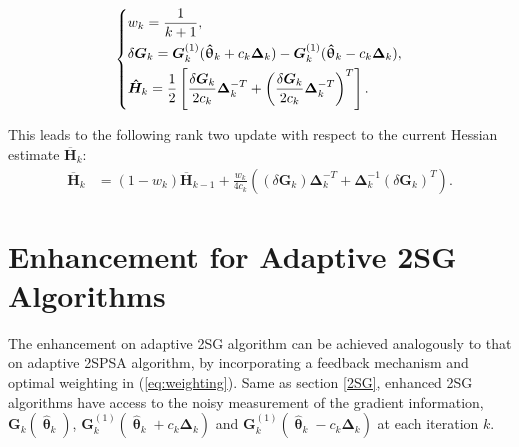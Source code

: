 \documentclass[conference,10.6cpt]{IEEEtran}
\newcommand{\bG}{\bm{G}}
\newcommand{\bDelta}{\bm{\Delta}}
\newcommand{\oH}{\bm{\overline{H}}}
\newcommand{\hH}{\bm{\hat{H}}}
\newcommand{\htheta}{\bm{\hat{\uptheta}}}
\newcommand{\remove}[1]{}
\begin{document}
\begin{equation} \label{eq:notationSG}
  \begin{dcases}
    w_k=\frac{1}{k+1},\\
    \delta\bG_k=\bG_k^{(1)}(\htheta_k+ c_k\bDelta_k)-\bG_k^{(1)}(\htheta_k- c_k\bDelta_k),\\
    \hH_k=\frac{1}{2}\left[ \frac{\delta\bG_k}{2c_k}\bDelta_k^{-T}+\left(\frac{\delta\bG_k}{2c_k}\bDelta_k^{-T}\right)^T \right].\\
  \end{dcases}
\end{equation}

This leads to the following rank two update with respect to
the current Hessian estimate $\oH_k$:
\begin{align*}
\oH_k &= (1 - w_k) \oH_{k-1} + \frac{w_k}{4c_k} ((\delta\bG_k)\bDelta_k^{-T}+\bDelta_k^{-1}(\delta\bG_k)^{T}).
\end{align*} \remove{ Above gives a rank-two update from $
  \oH_{k-1}^{-1} $ to $ \oH_{k}^{-1} $. Write the sequential recursions
  for the $ \oH_k^{-1} $ as following:
  \begin{equation} \label{eq:2SGSequentialUpdate}
    \begin{dcases} \bm{B}_k^{-1}
      &=\frac{k+1}{k}\oH_{k-1}^{-1}-(\frac{k+1}{k})^2\oH_{k-1}^{-1}(\delta\bG_k)\\
      &~~~\cdot(b_k^{-1}+\frac{k+1}{k}\bDelta_k^{-T}\oH_{k-1}^{-1}(\delta\bG_k)\bDelta_k^{-T}\oH_{k-1}^{-1}\\
      \oH_k^{-1} &=\bm{B}_k^{-1}-\bm{B}_k^{-1}\bDelta_k^{-1}\\
      &~~~\cdot(b_k^{-1}+(\delta\bG_k)^{T}\bm{B}_k^{-1}\bDelta_k^{-1})^{-1}(\delta\bG_k)^{T}\bm{B}_k^{-1}
    \end{dcases}
  \end{equation} where
  \begin{equation}\label{eq:2SGB}
    \bm{B}_k=\frac{k}{k+1}\oH_{k-1}+b_k(\delta\bG_k)\bDelta_k^{-T}
  \end{equation}}

\section{Enhancement for Adaptive 2SG Algorithms}  \label{Enhanced 2SG}
 The enhancement on adaptive 2SG algorithm can be achieved analogously to that on adaptive 2SPSA algorithm, by incorporating a feedback
 mechanism and optimal weighting in (\ref{eq:weighting}). Same as section \ref{2SG}, enhanced 2SG algorithms have access
 to the noisy measurement of the gradient information,
 $\bG_k(\htheta_k)$, $\bG_k^{(1)}(\htheta_k+ c_k\bDelta_k)$ and
 $\bG_k^{(1)}(\htheta_k- c_k\bDelta_k)$ at each iteration $k$.
\end{document}
